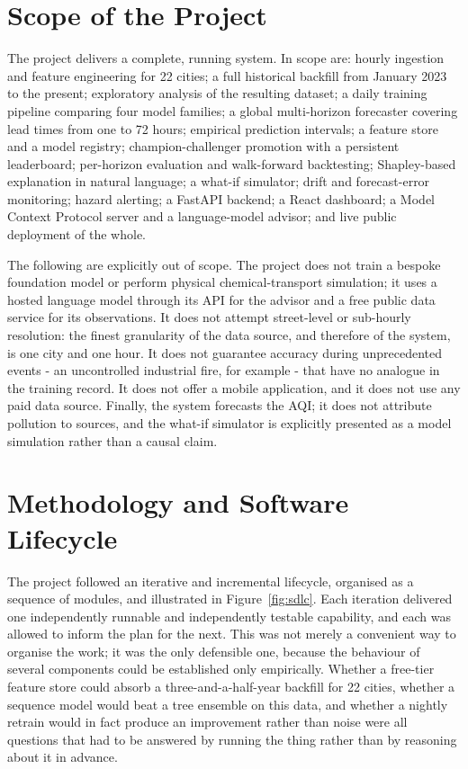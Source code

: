 \section{Scope of the Project}
The project delivers a complete, running system. In scope are: hourly ingestion
and feature engineering for 22 cities; a full historical backfill from January
2023 to the present; exploratory analysis of the resulting dataset; a daily
training pipeline comparing four model families; a global multi-horizon
forecaster covering lead times from one to 72 hours; empirical prediction
intervals; a feature store and a model registry; champion-challenger promotion
with a persistent leaderboard; per-horizon evaluation and walk-forward
backtesting; Shapley-based explanation in natural language; a what-if simulator;
drift and forecast-error monitoring; hazard alerting; a FastAPI backend; a React
dashboard; a Model Context Protocol server and a language-model advisor; and live
public deployment of the whole.

The following are explicitly out of scope. The project does not train a bespoke
foundation model or perform physical chemical-transport simulation; it uses a
hosted language model through its API for the advisor and a free public data
service for its observations. It does not attempt street-level or sub-hourly
resolution: the finest granularity of the data source, and therefore of the
system, is one city and one hour. It does not guarantee accuracy during
unprecedented events - an uncontrolled industrial fire, for example - that have
no analogue in the training record. It does not offer a mobile application, and
it does not use any paid data source. Finally, the system forecasts the AQI; it
does not attribute pollution to sources, and the what-if simulator is
explicitly presented as a model simulation rather than a causal claim.

\section{Methodology and Software Lifecycle}
The project followed an iterative and incremental lifecycle, organised as a
sequence of modules, and illustrated in Figure~\ref{fig:sdlc}. Each iteration
delivered one independently runnable and independently testable capability, and
each was allowed to inform the plan for the next. This was not merely a
convenient way to organise the work; it was the only defensible one, because the
behaviour of several components could be established only empirically. Whether a
free-tier feature store could absorb a three-and-a-half-year backfill for 22
cities, whether a sequence model would beat a tree ensemble on this data, and
whether a nightly retrain would in fact produce an improvement rather than noise
were all questions that had to be answered by running the thing rather than by
reasoning about it in advance.

